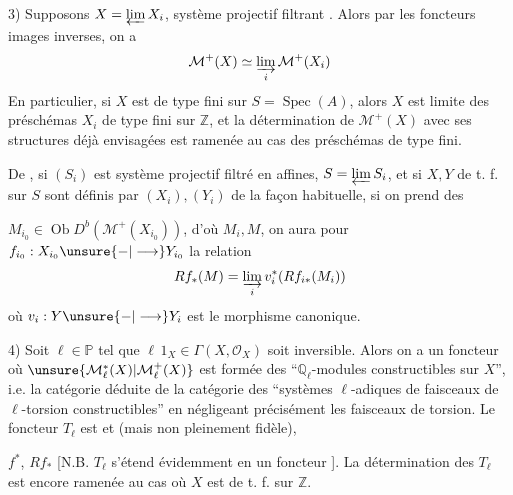 3) Supposons $X=\varprojlim X_i$, système projectif
filtrant . Alors par les foncteurs
images inverses, on a
\[
 \mathcal{M}^+(X)\simeq\varinjlim_i \mathcal{M}^+(X_i)
\]
En particulier, si $X$ est de type fini
sur $S=\operatorname{Spec}(A)$, alors $X$ est limite des
préschémas $X_i$ de type fini sur $\mathbb{Z}$, et
la détermination de $\mathcal{M}^+(X)$ avec ses
structures déjà envisagées est  ramenée
au cas des préschémas de type fini.

De , si $(S_i)$ est système
projectif filtré en affines, $S=\varprojlim S_i$,
et si $X,Y$ de t. f. sur $S$ sont
définis par $(X_i),(Y_i)$ de la
façon habituelle, si on prend des

$M_{i_0}\in\operatorname{Ob}D^b(\mathcal{M}^+(X_{i_0}))$, d'où $M_i,M$, on
aura pour $f_{i_0}:X_{i_0}\unsure{-|\longrightarrow}Y_{i_0}$ la relation
\[
 Rf_*(M)=\varinjlim_i v_i^*(Rf_{i*}(M_i))
\]
où $v_i:Y\unsure{-|\longrightarrow}Y_i$ est le morphisme
canonique.

4) Soit $\ell\in\mathbb{P}$ tel que $\ell\,1_X\in\Gamma(X,\mathcal O_X)$ soit
inversible. Alors on a un foncteur
où $\unsure{\mathcal{M}_\ell^*(X)|\mathcal{M}_\ell^+(X)}$ est 
formée des ``$\mathbb{Q}_\ell$-modules
constructibles sur $X$'', i.e. la catégorie
déduite de la catégorie des ``systèmes
$\ell$-adiques de faisceaux de $\ell$-torsion
constructibles'' en négligeant précisément
les faisceaux de torsion.
Le foncteur
$T_\ell$ est 
 et  (mais non
pleinement fidèle), 

 $f^*$, 
 $Rf_*$
[N.B. $T_\ell$ s'étend
évidemment en un foncteur
].
\unsure{$\{$} La détermination
des $T_\ell$ est encore ramenée au cas où
$X$ est de t. f. sur $\mathbb{Z}$.


